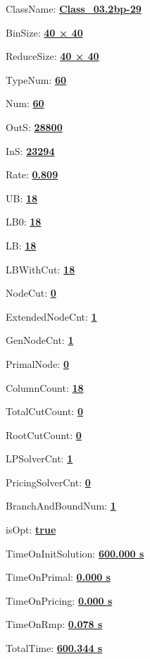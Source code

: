 \documentclass[11pt]{article}
\begin{document}
\pagestyle{empty}


ClassName: \underline{\textbf{Class_03.2bp-29}}
\par
BinSize: \underline{\textbf{40 × 40}}
\par
ReduceSize: \underline{\textbf{40 × 40}}
\par
TypeNum: \underline{\textbf{60}}
\par
Num: \underline{\textbf{60}}
\par
OutS: \underline{\textbf{28800}}
\par
InS: \underline{\textbf{23294}}
\par
Rate: \underline{\textbf{0.809}}
\par
UB: \underline{\textbf{18}}
\par
LB0: \underline{\textbf{18}}
\par
LB: \underline{\textbf{18}}
\par
LBWithCut: \underline{\textbf{18}}
\par
NodeCut: \underline{\textbf{0}}
\par
ExtendedNodeCnt: \underline{\textbf{1}}
\par
GenNodeCnt: \underline{\textbf{1}}
\par
PrimalNode: \underline{\textbf{0}}
\par
ColumnCount: \underline{\textbf{18}}
\par
TotalCutCount: \underline{\textbf{0}}
\par
RootCutCount: \underline{\textbf{0}}
\par
LPSolverCnt: \underline{\textbf{1}}
\par
PricingSolverCnt: \underline{\textbf{0}}
\par
BranchAndBoundNum: \underline{\textbf{1}}
\par
isOpt: \underline{\textbf{true}}
\par
TimeOnInitSolution: \underline{\textbf{600.000 s}}
\par
TimeOnPrimal: \underline{\textbf{0.000 s}}
\par
TimeOnPricing: \underline{\textbf{0.000 s}}
\par
TimeOnRmp: \underline{\textbf{0.078 s}}
\par
TotalTime: \underline{\textbf{600.344 s}}
\par
\newpage


\end{document}
